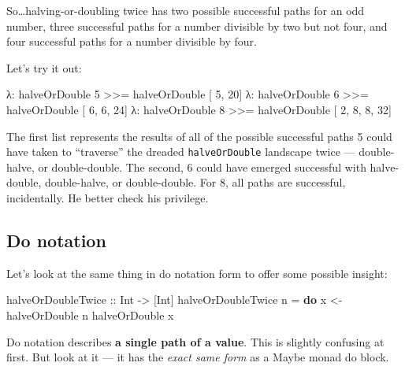 \documentclass[]{article}
\newenvironment{Shaded}{}{}
\newcommand{\KeywordTok}[1]{\textcolor[rgb]{0.00,0.44,0.13}{\textbf{{#1}}}}
\newcommand{\DataTypeTok}[1]{\textcolor[rgb]{0.56,0.13,0.00}{{#1}}}
\newcommand{\DecValTok}[1]{\textcolor[rgb]{0.25,0.63,0.44}{{#1}}}
\newcommand{\OtherTok}[1]{\textcolor[rgb]{0.00,0.44,0.13}{{#1}}}
\newcommand{\FunctionTok}[1]{\textcolor[rgb]{0.02,0.16,0.49}{{#1}}}
\newcommand{\NormalTok}[1]{{#1}}
\begin{document}
So\ldots{}halving-or-doubling twice has two possible successful paths for an odd number, three
successful paths for a number divisible by two but not four, and four successful paths for a number
divisible by four.

Let's try it out:

\begin{Shaded}
\begin{Highlighting}[]
\NormalTok{λ}\FunctionTok{:} \NormalTok{halveOrDouble }\DecValTok{5} \FunctionTok{>>=} \NormalTok{halveOrDouble}
\NormalTok{[       }\DecValTok{5}\NormalTok{, }\DecValTok{20}\NormalTok{]}
\NormalTok{λ}\FunctionTok{:} \NormalTok{halveOrDouble }\DecValTok{6} \FunctionTok{>>=} \NormalTok{halveOrDouble}
\NormalTok{[    }\DecValTok{6}\NormalTok{, }\DecValTok{6}\NormalTok{, }\DecValTok{24}\NormalTok{]}
\NormalTok{λ}\FunctionTok{:} \NormalTok{halveOrDouble }\DecValTok{8} \FunctionTok{>>=} \NormalTok{halveOrDouble}
\NormalTok{[ }\DecValTok{2}\NormalTok{, }\DecValTok{8}\NormalTok{, }\DecValTok{8}\NormalTok{, }\DecValTok{32}\NormalTok{]}
\end{Highlighting}
\end{Shaded}

The first list represents the results of all of the possible successful paths 5 could have taken to
``traverse'' the dreaded \texttt{halveOrDouble} landscape twice --- double-halve, or double-double.
The second, 6 could have emerged successful with halve-double, double-halve, or double-double. For
8, all paths are successful, incidentally. He better check his privilege.

\subsection{Do notation}\label{do-notation}

Let's look at the same thing in do notation form to offer some possible insight:

\begin{Shaded}
\begin{Highlighting}[]
\OtherTok{halveOrDoubleTwice ::} \DataTypeTok{Int} \OtherTok{->} \NormalTok{[}\DataTypeTok{Int}\NormalTok{]}
\NormalTok{halveOrDoubleTwice n }\FunctionTok{=} \KeywordTok{do}
    \NormalTok{x }\OtherTok{<-} \NormalTok{halveOrDouble n}
    \NormalTok{halveOrDouble x}
\end{Highlighting}
\end{Shaded}

Do notation describes \textbf{a single path of a value}. This is slightly confusing at first. But
look at it --- it has the \emph{exact same form} as a Maybe monad do block.
\end{document}
